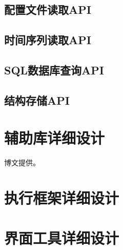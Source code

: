         \section{配置文件读取API}
        \section{时间序列读取API}
        \section{SQL数据库查询API}
        \section{结构存储API}
    \chapter{辅助库详细设计}

    \LARGE{博文提供}\normalsize。
    \chapter{执行框架详细设计}
    \chapter{界面工具详细设计}
